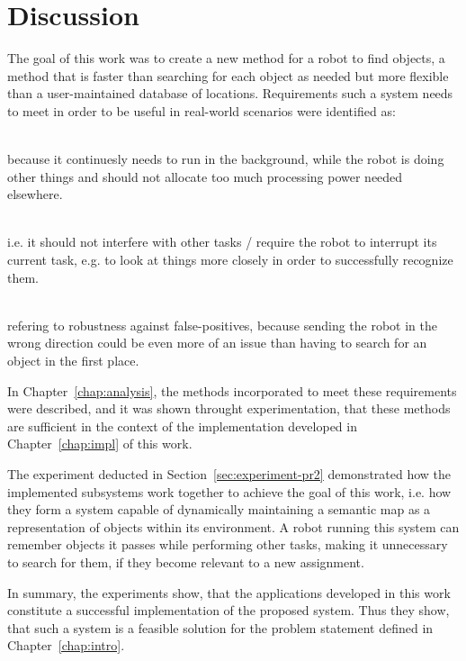 \chapter{Discussion}
The goal of this work was to create a new method for a robot to find objects, a method that is faster than searching for each object as needed but more flexible than a user-maintained database of locations. Requirements such a system needs to meet in order to be useful in real-world scenarios were identified as:
\begin{description}[leftmargin=8mm,labelindent=0mm]
  \item[Speed] \hfill \\
  because it continuesly needs to run in the background, while the robot is doing other things and should not allocate too much processing power needed elsewhere.
  \item[Unobtrusiveness] \hfill \\
  i.e. it should not interfere with other tasks / require the robot to interrupt its current task, e.g. to look at things more closely in order to successfully recognize them.
  \item[Correctness / Reliability] \hfill \\
  refering to robustness against false-positives, because sending the robot in the wrong direction could be even more of an issue than having to search for an object in the first place.
\end{description}
In Chapter~\ref{chap:analysis}, the methods incorporated to meet these requirements were described, and it was shown throught experimentation, that these methods are sufficient in the context of the implementation developed in Chapter~\ref{chap:impl} of this work.

The experiment deducted in Section~\ref{sec:experiment-pr2} demonstrated how the implemented subsystems work together to achieve the goal of this work, i.e. how they form a system capable of dynamically maintaining a semantic map as a representation of objects within its environment. A robot running this system can remember objects it passes while performing other tasks, making it unnecessary to search for them, if they become relevant to a new assignment.

In summary, the experiments show, that the applications developed in this work constitute a successful implementation of the proposed system. Thus they show, that such a system is a feasible solution for the problem statement defined in Chapter~\ref{chap:intro}. \\

